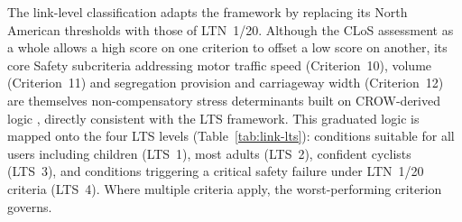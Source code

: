 \documentclass[final,5p,times,twocolumn,authoryear]{elsarticle}
\begin{document}
The link-level classification adapts the \citet{mekuria2012a} framework by replacing its North American thresholds with those of LTN~1/20. Although the CLoS assessment as a whole allows a high score on one criterion to offset a low score on another, its core Safety subcriteria addressing motor traffic speed (Criterion~10), volume (Criterion~11) and segregation provision and carriageway width (Criterion~12) are themselves non-compensatory stress determinants built on CROW-derived logic \citep{crow2016}, directly consistent with the LTS framework. This graduated logic is mapped onto the four LTS levels (Table~\ref{tab:link-lts}): conditions suitable for all users including children (LTS~1), most adults (LTS~2), confident cyclists (LTS~3), and conditions triggering a critical safety failure under LTN~1/20 criteria (LTS~4). Where multiple criteria apply, the worst-performing criterion governs.
\end{document}
